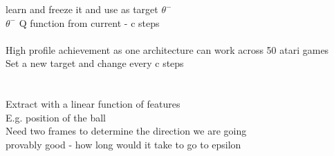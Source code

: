 \documentclass[11pt]{article}
\begin{document}
learn and freeze it and use as target $\theta^{-}$ \\
$\theta^{-}$ Q function from current - c steps\\\\
High profile achievement as one architecture can work across 50 atari games\\
Set a new target and change every c steps\\\\\\
Extract with a linear function of features\\
E.g. position of the ball
\\
Need two frames to determine the direction we are going\\
provably good - how long would it take to go to epsilon
\end{document}
